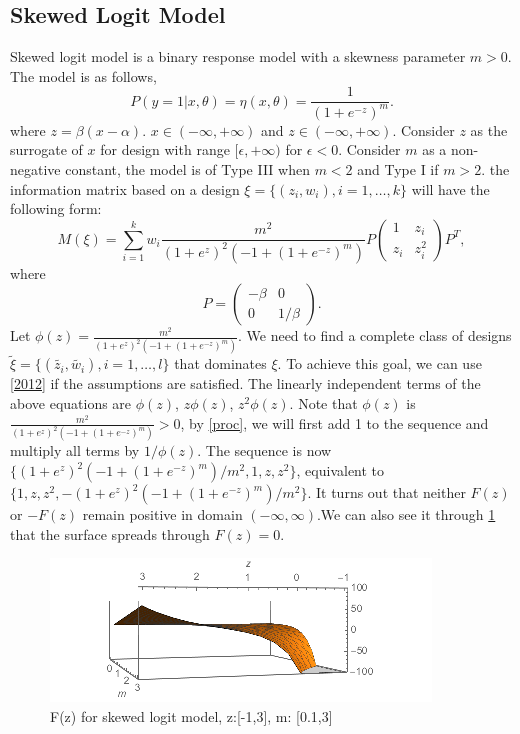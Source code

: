 \documentclass[11pt]{amsart}
\theoremstyle{definition}
\theoremstyle{remark}
\begin{document}
\subsection{Skewed Logit Model}
Skewed logit model is a binary response model with a skewness parameter $m>0$. The model is as follows,\[
P(y=1|x,\theta) = \eta(x,\theta)= \frac{1}{(1+e^{-z})^m}.
\]where $z = \beta(x-\alpha)$. $x\in (-\infty,+\infty)$ and $z\in (-\infty,+\infty)$. Consider $z$ as the surrogate of $x$ for design with range $[\epsilon, +\infty)$ for $\epsilon <0$. Consider $m$ as a non-negative constant, the model is of Type III when $m<2$ and Type I if $m>2$. the information matrix based on a design $\xi = \{(z_i,w_i), i=1,\ldots,k\}$ will have the following form: \begin{equation}
M(\xi) = \sum_{i=1}^{k} w_i \frac{m^2}{(1+e^z)^2(-1+(1+e^{-z})^m)}P \left( \begin{array}{cc}
1 & z_i\\
z_i & z_i^2
\end{array} \right) P^T,
\end{equation} where \[P = \left( \begin{array}{cc}
-\beta & 0\\
0 & 1/\beta
\end{array} \right).\] 
Let $\phi(z) =  \frac{m^2}{(1+e^z)^2(-1+(1+e^{-z})^m)}$. We need to find a complete class of designs $\tilde{\xi} = \{(\tilde{z_i},\tilde{w_i}), i=1,\ldots,l\}$ that dominates $\xi$. To achieve this goal, we can use \ref{2012} if the assumptions are satisfied. The linearly independent terms of the above equations are $\phi(z)$, $z\phi(z)$, $z^2\phi(z)$. Note that  $\phi(z)$ is $\frac{m^2}{(1+e^z)^2(-1+(1+e^{-z})^m)}>0$, by \ref{proc}, we will first add 1 to the sequence and multiply all terms by $1/\phi(z)$. The sequence is now $\{(1+e^z)^2(-1+(1+e^{-z})^m)/m^2, 1,z, z^2\}$, equivalent to $\{1,z, z^2,-(1+e^z)^2(-1+(1+e^{-z})^m)/m^2\}$. It turns out that neither $F(z)$ or $-F(z)$ remain positive in domain $(-\infty,\infty)$.We can also see it through \ref{fig:skewedlogit_before} that the surface spreads through $F(z)=0$.\begin{figure}[h]
    \centering
    \includegraphics[scale = 0.8]{skewedlogit_before.png}
    \caption{F(z) for skewed logit model, z:[-1,3], m: [0.1,3]}
    \label{fig:skewedlogit_before}
\end{figure}
\end{document}
